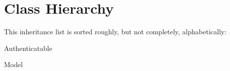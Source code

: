 \section{Class Hierarchy}
This inheritance list is sorted roughly, but not completely, alphabetically\+:\begin{DoxyCompactList}
\item Authenticatable\begin{DoxyCompactList}
\item {}
\end{DoxyCompactList}
\item Model\begin{DoxyCompactList}
\item {}
\item {}
\end{DoxyCompactList}
\end{DoxyCompactList}
